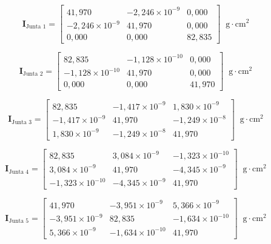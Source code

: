 \begin{equation}
\mathbf{I}_{\text{Junta 1}} =
\begin{bmatrix}
41,970 & -2,246\times 10^{-9} & 0,000 \\
-2,246\times 10^{-9} & 41,970 & 0,000 \\
0,000 & 0,000 & 82,835
\end{bmatrix} \;\; \text{g$\cdot$cm$^{2}$}
\end{equation}

\begin{equation}
\mathbf{I}_{\text{Junta 2}} =
\begin{bmatrix}
82,835 & -1,128\times 10^{-10} & 0,000 \\
-1,128\times 10^{-10} & 41,970 & 0,000 \\
0,000 & 0,000 & 41,970
\end{bmatrix} \;\; \text{g$\cdot$cm$^{2}$}
\end{equation}

\begin{equation}
\mathbf{I}_{\text{Junta 3}} =
\begin{bmatrix}
82,835 & -1,417\times 10^{-9} & 1,830\times 10^{-9} \\
-1,417\times 10^{-9} & 41,970 & -1,249\times 10^{-8} \\
1,830\times 10^{-9} & -1,249\times 10^{-8} & 41,970
\end{bmatrix} \;\; \text{g$\cdot$cm$^{2}$}
\end{equation}

\begin{equation}
\mathbf{I}_{\text{Junta 4}} =
\begin{bmatrix}
82,835 & 3,084\times 10^{-9} & -1,323\times 10^{-10} \\
3,084\times 10^{-9} & 41,970 & -4,345\times 10^{-9} \\
-1,323\times 10^{-10} & -4,345\times 10^{-9} & 41,970
\end{bmatrix} \;\; \text{g$\cdot$cm$^{2}$}
\end{equation}

\begin{equation}
\mathbf{I}_{\text{Junta 5}} =
\begin{bmatrix}
41,970 & -3,951\times 10^{-9} & 5,366\times 10^{-9} \\
-3,951\times 10^{-9} & 82,835 & -1,634\times 10^{-10} \\
5,366\times 10^{-9} & -1,634\times 10^{-10} & 41,970
\end{bmatrix} \;\; \text{g$\cdot$cm$^{2}$}
\end{equation}

